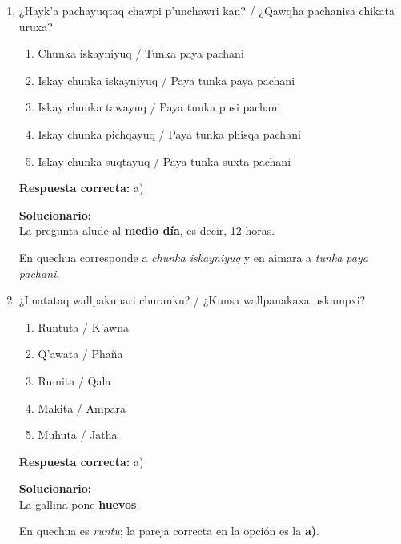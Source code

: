 \begin{enumerate}

	
	\item ¿Hayk’a pachayuqtaq chawpi p’unchawri kan? / ¿Qawqha pachanisa chikata uruxa?
	\begin{enumerate}[label=\alph*)]
		\item Chunka iskayniyuq / Tunka paya pachani
		\item Iskay chunka iskayniyuq / Paya tunka paya pachani
		\item Iskay chunka tawayuq / Paya tunka pusi pachani
		\item Iskay chunka pichqayuq / Paya tunka phisqa pachani
		\item Iskay chunka suqtayuq / Paya tunka suxta pachani
	\end{enumerate}
	\textbf{Respuesta correcta:} a)
	
	\vspace{2mm}
	\textbf{Solucionario:}\\
	La pregunta alude al \textbf{medio día}, es decir, 12 horas.
	
	En quechua corresponde a \textit{chunka iskayniyuq} y en aimara a \textit{tunka paya pachani}.
	

	
	\vspace{6mm}
	
	\item ¿Imatataq wallpakunari churanku? / ¿Kunsa wallpanakaxa uskampxi?
	\begin{enumerate}[label=\alph*)]
		\item Runtuta / K'awna
		\item Q’awata / Phaña
		\item Rumita / Qala
		\item Makita / Ampara
		\item Muhuta / Jatha
	\end{enumerate}
	\textbf{Respuesta correcta:} a)
	
	\vspace{2mm}
	\textbf{Solucionario:}\\
	La gallina pone \textbf{huevos}.
	
	En quechua es \textit{runtu}; la pareja correcta en la opción es la \textbf{a)}.
	

	
	\vspace{6mm}
\end{enumerate}